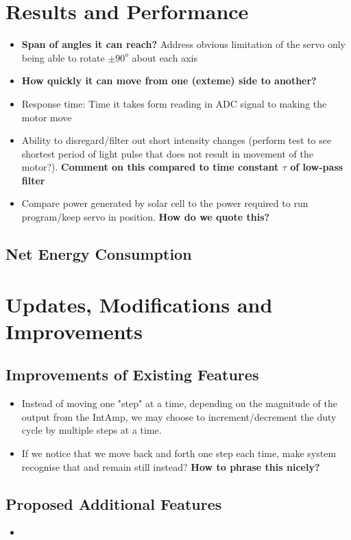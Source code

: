 \documentclass[journal]{Imperial_lab_report}
\begin{document}
\section{Results and Performance}
\begin{itemize}
	\item \textbf{Span of angles it can reach?} Address obvious limitation of the servo only being able to rotate $\pm 90^{o}$ about each axis
	\item \textbf{How quickly it can move from one (exteme) side to another?}
	\item Response time: Time it takes form reading in ADC signal to making the motor move
	\item Ability to disregard/filter out short intensity changes (perform test to see shortest period of light pulse that does not result in movement of the motor?). \textbf{Comment on this compared to time constant $\tau$ of low-pass filter}
	\item Compare power generated by solar cell to the power required to run program/keep servo in position. \textbf{How do we quote this?}
\end{itemize}

\subsection{Net Energy Consumption}

\section{Updates, Modifications and Improvements}
\subsection{Improvements of Existing Features}
\begin{itemize}
	\item Instead of moving one "step" at a time, depending on the magnitude of the output from the IntAmp, we may choose to increment/decrement the duty cycle by multiple steps at a time. 
	\item If we notice that we move back and forth one step each time, make system recognise that and remain still instead? \textbf{How to phrase this nicely?}
\end{itemize}

\subsection{Proposed Additional Features}
\begin{itemize}
	\item 
\end{itemize}
\end{document}
